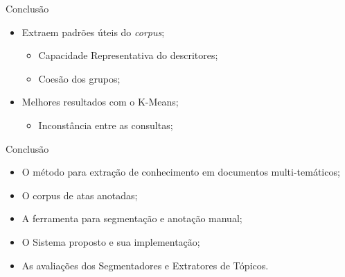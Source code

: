 \documentclass[xcolor=dvipsnames]{beamer}
\begin{document}
\begin{frame}{Conclusão}

	\begin{itemize}
		\item Extraem padrões úteis do \textit{corpus};
			\begin{itemize}
				\item Capacidade Representativa do descritores;
				\item Coesão dos grupos;
			\end{itemize}
		\item Melhores resultados com o K-Means;
			\begin{itemize}
				\item Inconstância entre as consultas;
			\end{itemize}
	\end{itemize}

\end{frame}



\begin{frame}{Conclusão}

	 {

	\begin{itemize}
\item O método para extração de conhecimento em documentos multi-temáticos; 
\item O corpus de atas anotadas;
\item A ferramenta para segmentação e anotação manual;
\item O Sistema proposto e sua implementação; 
\item As avaliações dos Segmentadores e Extratores de Tópicos.

	\end{itemize}
	}



\end{frame}










\end{document}
